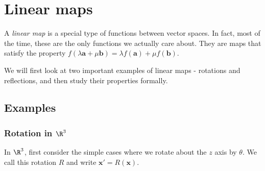 \documentclass[a4paper]{article}
\begin{document}
\section{Linear maps}
A \emph{linear map} is a special type of functions between vector spaces. In fact, most of the time, these are the only functions we actually care about. They are maps that satisfy the property $f(\lambda \mathbf{a} + \mu \mathbf{b}) = \lambda f(\mathbf{a}) + \mu f(\mathbf{b})$.

We will first look at two important examples of linear maps - rotations and reflections, and then study their properties formally.
\subsection{Examples}
\subsubsection{Rotation in \texorpdfstring{$\R^3$}{R3}}
In $\R^3$, first consider the simple cases where we rotate about the $z$ axis by $\theta$. We call this rotation $R$ and write $\mathbf{x}' = R(\mathbf{x})$.
\end{document}

